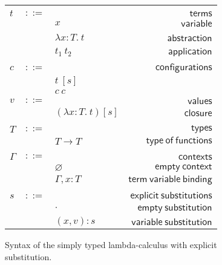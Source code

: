 \documentclass {article}
\newcommand{\app}[2]{#1 \ #2}
\newcommand{\abs}[3]{\lambda #1:#2. \ #3}
\newcommand{\conf}[2][s]{(#2)[#1]}
\begin{document}
\begin{figure}
\begin{small}
\begin{center}
\begin{tabular}{|l c l r|}
\hline
&&&\\
$t$&$::=$&&$\mathsf {terms}$\\
&&$x$&$\mathsf {variable}$\\
&&$\abs {x}{T}{t}$&\ $\mathsf {abstraction}$\\
&&$\app {t_1}{t_2}$&$\mathsf {application}$\\
&&&\\
$c$&$::=$&&$\mathsf {configurations}$\\
&&$t\ [s]$&\\
&&$c \ c $&\\
$v$&$::=$&&$\mathsf {values}$\\
&&$\conf {\abs {x}{T}{t}}$&$\mathsf {closure}$\\
&&&\\
$T$&$::=$&&$\mathsf {types}$\\
&&$T \to T$&$\mathsf {type \ of \ functions}$\\
&&&\\
$\Gamma$&$::=$&&$\mathsf {contexts}$\\
&&$\varnothing$&$\mathsf {empty \ context}$\\
&&$\Gamma , x:T$&$\mathsf {term \ variable \ binding}$\\
&&&\\
$s$&$::=$&&$\mathsf {explicit \ substitutions}$\\
&&$\cdot$&$\mathsf {empty \ substitution}$\\
&&$(x,v):s$&$\mathsf {variable \ substitution}$\\
\hline
\end{tabular}
\caption{Syntax of the simply typed lambda-calculus with explicit substitution.}
\label{figure:sencilla}
\end{center}
\end{small}
\end{figure}
\end{document}
